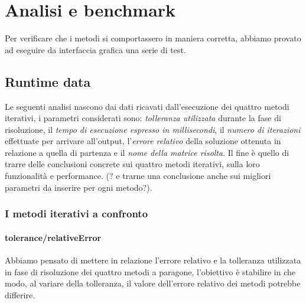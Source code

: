 \section{Analisi e benchmark}

Per verificare che i metodi si comportassero in maniera corretta, abbiamo provato ad eseguire da interfaccia grafica una serie di test.




\subsection{Runtime data}

Le seguenti analisi nascono dai dati ricavati dall'esecuzione dei quattro metodi iterativi, i parametri considerati sono: \textit{tolleranza utilizzata} durante la fase di risoluzione, il \textit{tempo di esecuzione espresso in millisecondi}, il \textit{numero di iterazioni} effettuate per arrivare all'output, l'\textit{errore relativo} della soluzione ottenuta in relazione a quella di partenza e il \textit{nome della matrice risolta}. Il fine è quello di trarre delle conclusioni concrete sui quattro metodi iterativi, sulla loro funzionalità e performance.
(? e trarne una conclusione anche sui migliori parametri da inserire per ogni metodo?).


\subsubsection{I metodi iterativi a confronto}

\paragraph{tolerance/relativeError}
Abbiamo pensato di mettere in relazione l'errore relativo e la tolleranza utilizzata in fase di risoluzione dei quattro metodi a paragone, l'obiettivo è stabilire in che modo, al variare della tolleranza, il valore dell'errore relativo dei metodi potrebbe differire.




